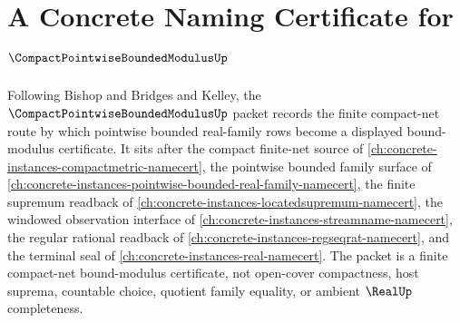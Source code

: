 \chapter{A Concrete Naming Certificate for $\CompactPointwiseBoundedModulusUp$}
\label{ch:concrete-instances-compact-pointwise-bounded-modulus-namecert}

Following Bishop and Bridges and Kelley, the $\CompactPointwiseBoundedModulusUp$ packet records the finite compact-net route by which pointwise bounded real-family rows become a displayed bound-modulus certificate. It sits after the compact finite-net source of \autoref{ch:concrete-instances-compactmetric-namecert}, the pointwise bounded family surface of \autoref{ch:concrete-instances-pointwise-bounded-real-family-namecert}, the finite supremum readback of \autoref{ch:concrete-instances-locatedsupremum-namecert}, the windowed observation interface of \autoref{ch:concrete-instances-streamname-namecert}, the regular rational readback of \autoref{ch:concrete-instances-regseqrat-namecert}, and the terminal seal of \autoref{ch:concrete-instances-real-namecert}. The packet is a finite compact-net bound-modulus certificate, not open-cover compactness, host suprema, countable choice, quotient family equality, or ambient $\RealUp$ completeness.

